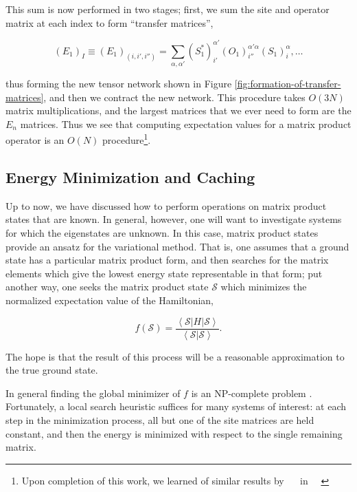 \documentclass[12pt]{amsbook}
\theoremstyle{plain}
\theoremstyle{definition}
\theoremstyle{remark}
\newcommand{\cip}[2]{\left<#1|#2\right>}
\newcommand{\coip}[3]{\left<#1\left|#2\right|#3\right>}
\newcommand{\paren}[1]{\left(#1\right)}
\begin{document}
This sum is now performed in two stages;  first, we sum the site and operator matrix at each index to form ``transfer matrices'',

$$\paren{E_1}_I \equiv \paren{E_1}_{(i,i',i'')}
                 = \sum_{\alpha,\alpha'} \paren{S^*_1}^{\alpha'}_{i'}\paren{O_1}^{\alpha'\alpha}_{i''}\paren{S_1}^{\alpha}_i, \dots$$

\noindent thus forming the new tensor network shown in Figure \ref{fig:formation-of-transfer-matrices}, and then we contract the new network.  This procedure takes $O(3N)$ matrix multiplications, and the largest matrices that we ever need to form are the $E_n$ matrices.  Thus we see that computing expectation values for a matrix product operator is an $O(N)$ procedure\footnote{Upon completion of this work, we learned of similar results by \underline{$\quad$} in \underline{$\quad$}}.
\subsection{Energy Minimization and Caching}

\label{caching}

Up to now, we have discussed how to perform operations on matrix product states that are known.  In general, however, one will want to investigate systems for which the eigenstates are unknown.  In this case, matrix product states provide an ansatz for the variational method.  That is, one assumes that a ground state has a particular matrix product form, and then searches for the matrix elements which give the lowest energy state representable in that form;  put another way, one seeks the matrix product state $\mathscr{S}$ which minimizes the normalized expectation value of the Hamiltonian,

$$f(\mathscr{S}) = \frac{\coip{\mathscr{S}}{H}{\mathscr{S}}}{\cip{\mathscr{S}}{\mathscr{S}}}.$$

\noindent The hope is that the result of this process will be a reasonable approximation to the true ground state.

In general finding the global minimizer of $f$ is an NP-complete problem \cite{quant-ph/0609051}.  Fortunately, a local search heuristic suffices for many systems of interest:  at each step in the minimization process, all but one of the site matrices are held constant, and then the energy is minimized with respect to the single remaining matrix.
\end{document}
